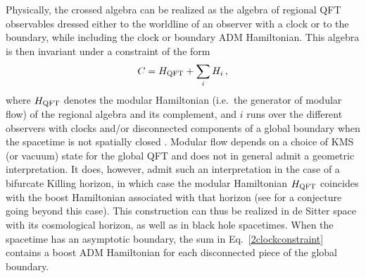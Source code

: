 \documentclass[]{jkpaper}
\theoremstyle{plain}
\theoremstyle{definition}
\begin{document}
Physically, the crossed algebra can be realized as the algebra of regional QFT observables dressed either to the worldline of an observer with a clock or to the boundary, while including the clock or boundary ADM Hamiltonian. This algebra is then invariant under a constraint of the form
\begin{equation}\label{2clockconstraint}
     C = H_{\rm QFT}+\sum_i H_i\,,
\end{equation}
where $H_{\rm QFT}$ denotes the modular Hamiltonian (i.e.\ the generator of modular flow) of the regional algebra and its complement, and $i$ runs over the different observers with clocks and/or disconnected components of a global boundary when the spacetime is not spatially closed \cite{DeVuyst:2024pop,DVEHK}. Modular flow depends on a choice of KMS (or vacuum) state for the global QFT and does not in general admit a geometric interpretation. It does, however, admit such an interpretation in the case of a bifurcate Killing horizon, in which case the modular Hamiltonian $H_{\rm QFT}$ coincides with the boost Hamiltonian  associated with that horizon \cite{haag2012local,Bisognano:1975ih,Sewell:1982zz,sorce2024analyticity} (see \cite{Jensen:2023yxy,sorce2024analyticity} for a conjecture going beyond this case). This construction can thus be realized in de Sitter space with its cosmological horizon, as well as in black hole spacetimes. When the spacetime has an asymptotic boundary, the sum in Eq.~\eqref{2clockconstraint} contains a boost ADM Hamiltonian for each disconnected piece of the global boundary.
\end{document}
